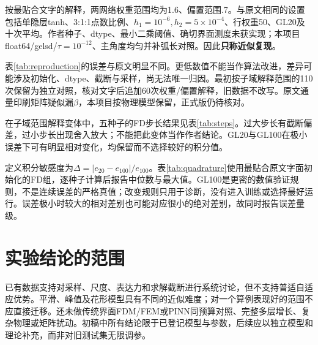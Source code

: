 按最贴合文字的解释，两网络权重范围均为1.6、偏置范围.7。与原文相同的设置包括单隐层tanh、3:1:1点数比例、$h_1=10^{-6},h_2=5\times10^{-4}$、行权重50、GL20及十次平均。作者种子、dtype、最小二乘阈值、确切界面测度未获实现；本项目float64/gelsd/$\tau=10^{-12}$、主角度均匀并补弧长对照。因此\textbf{只称近似复现}。
\begin{table}[htbp]\centering\small\caption{原文表1与本项目近似复现，十种子均值}\label{tab:reproduction}\resizebox{\textwidth}{!}{}\end{table}
表\ref{tab:reproduction}的误差与原文明显不同。更低数值不能当作算法改进，差异可能涉及初始化、dtype、截断与采样，尚无法唯一归因。最初按子域解释范围的110次保留为独立对照，核对文字后追加60次权重/偏置解释，旧数据不改写。原文通量印刷矩阵疑似漏$\beta$，本项目按物理模型保留，正式版仍待核对。

在子域范围解释变体中，五种子的FD步长结果见表\ref{tab:steps}。过大步长有截断偏差，过小步长出现舍入放大；不能把此变体当作作者结论。GL20与GL100在极小误差下可有明显相对变化，均保留而不选择较好的积分值。
\begin{table}[htbp]\centering\caption{FD步长独立诊断，$m=160,N=1000$}\label{tab:steps}\end{table}

定义积分敏感度为$\Delta=|e_{20}-e_{100}|/e_{100}$。表\ref{tab:quadrature}使用最贴合原文字面初始化的FD组，逐种子计算后报告中位数与最大值。GL100是更密的数值验证规则，不是连续误差的严格真值；改变规则只用于诊断，没有进入训练或选择最好运行。误差极小时较大的相对差别也可能对应很小的绝对差别，故同时报告误差量级。
\begin{table}[htbp]\centering\caption{花形界面误差对积分规则的敏感度，十种子}\label{tab:quadrature}\resizebox{\textwidth}{!}{}\end{table}

\section{实验结论的范围}
已有数据支持对采样、尺度、表达力和求解截断进行系统讨论，但不支持普适自适应优势。平滑、峰值及花形模型具有不同的近似难度；对一个算例表现好的范围不应直接迁移。还未做传统界面FDM/FEM或PINN同预算对照、完整多层增长、复杂物理或矩阵扰动。初稿中所有结论限于已登记模型与参数，后续应以独立模型和理论补充，而非对旧测试集无限调参。


